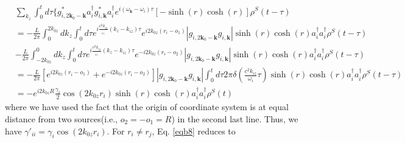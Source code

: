 \documentclass[aps,showpacs,onecolumn,twoside,groupedaddress]{revtex4}
\let\vec\bm
\begin{document}
\begin{equation}
\label{eqb9}
\begin{split}
&\underset{k_{z}}{\sum}\int_{0}^{t}d\tau\{g_{i,2\vec{k}_{0}-\vec{k}}^{*}a_{i}^{\dagger}g_{i,\vec{k}}^{*}a_{i}^{\dagger}e^{i(\omega_{\vec{k}}-\omega_{i})\tau}[-\sinh(r)\cosh(r)]\rho^{S}(t-\tau)\\
&=-\frac{L}{2\pi}\int_{0}^{2k_{0z}}dk_{z}\int_{0}^{t}d\tau e^{i\frac{c^{2}k_{iz}}{_{\omega_{i}}}(k_{z}-k_{iz})\tau}e^{i2k_{0z}(r_{i}-o_{1})}|g_{i,2\vec{k}_{0}-\vec{k}}g_{i,\vec{k}}|\sinh(r)\cosh(r)a_{i}^{\dagger}a_{i}^{\dagger}\rho^{S}(t-\tau)\\
&-\frac{L}{2\pi}\int_{-2k_{0z}}^{0}dk_{z}\int_{0}^{t}d\tau e^{i\frac{c^{2}k_{iz}}{_{\omega_{i}}}(k_{z}-k_{iz})\tau}e^{-i2k_{0z}(r_{i}-o_{2})}|g_{i,2\vec{k}_{0}-\vec{k}}g_{i,\vec{k}}|\sinh(r)\cosh(r)a_{i}^{\dagger}a_{i}^{\dagger}\rho^{S}(t-\tau)\\
&=-\frac{L}{2\pi}[e^{i2k_{0z}(r_{i}-o_{1})}+e^{-i2k_{0z}(r_{i}-o_{2})}]|g_{i,2\vec{k}_{0}-\vec{k}}g_{i,\vec{k}}|\int_{0}^{t}d\tau2\pi\delta(\frac{c^{2}k_{iz}}{\omega_{i}}\tau)\sinh(r)\cosh(r)a_{i}^{\dagger}a_{i}^{\dagger}\rho^{S}(t-\tau)\\
& =-e^{i2k_{0z}R}\frac{\gamma_{i}}{2}\cos(2k_{0z}r_{i})\sinh(r)\cosh(r)a_{i}^{\dagger}a_{i}^{\dagger}\rho^{S}(t)
\end{split}
\end{equation}
where we have used the fact that the origin of coordinate system is at equal distance from two sources(i.e., $o_2=-o_1=R$) in the second last line. Thus, we have $\gamma'_{ii}=\gamma_{i}\cos(2k_{0z}r_{i})$. For $r_i\neq r_j$, Eq. \eqref{eqb8} reduces to
\end{document}
